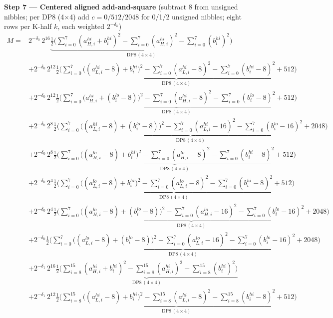 \documentclass[fleqn]{article}
\newcommand{\DPop}[3]{\mathrm{DP#1}\,(#2\!\times\!#3)}
\begin{document}
\textbf{Step 7 --- Centered aligned add-and-square}\quad
{\small(subtract $8$ from unsigned nibbles; per DP8 (4$\times$4) add $c=0/512/2048$ for 0/1/2 unsigned nibbles; eight rows per K-half $k$, each weighted $2^{-\delta_k}$)}
{\small
\begin{align*}
M = {}
  & 2^{-\delta_0}\,2^{16}\underbrace{\tfrac12\Big(\sum_{i=0}^{7}(a_{H,i}^{hi}{+}b_i^{hi})^2 - \sum_{i=0}^{7}(a_{H,i}^{hi})^2 - \sum_{i=0}^{7}(b_i^{hi})^2\Big)}_{\DPop{8}{4}{4}} \\[0.15em]
  & + 2^{-\delta_0}\,2^{12}\underbrace{\tfrac12\Big(\sum_{i=0}^{7}\big((a_{L,i}^{hi}{-}8){+}b_i^{hi}\big)^2 - \sum_{i=0}^{7}(a_{L,i}^{hi}{-}8)^2 - \sum_{i=0}^{7}(b_i^{hi}{-}8)^2 + 512\Big)}_{\DPop{8}{4}{4}} \\[0.15em]
  & + 2^{-\delta_0}\,2^{12}\underbrace{\tfrac12\Big(\sum_{i=0}^{7}\big(a_{H,i}^{hi}{+}(b_i^{lo}{-}8)\big)^2 - \sum_{i=0}^{7}(a_{H,i}^{hi}{-}8)^2 - \sum_{i=0}^{7}(b_i^{lo}{-}8)^2 + 512\Big)}_{\DPop{8}{4}{4}} \\[0.15em]
  & + 2^{-\delta_0}\,2^{8}\underbrace{\tfrac12\Big(\sum_{i=0}^{7}\big((a_{L,i}^{hi}{-}8){+}(b_i^{lo}{-}8)\big)^2 - \sum_{i=0}^{7}(a_{L,i}^{hi}{-}16)^2 - \sum_{i=0}^{7}(b_i^{lo}{-}16)^2 + 2048\Big)}_{\DPop{8}{4}{4}} \\[0.15em]
  & + 2^{-\delta_0}\,2^{8}\underbrace{\tfrac12\Big(\sum_{i=0}^{7}\big((a_{H,i}^{lo}{-}8){+}b_i^{hi}\big)^2 - \sum_{i=0}^{7}(a_{H,i}^{lo}{-}8)^2 - \sum_{i=0}^{7}(b_i^{hi}{-}8)^2 + 512\Big)}_{\DPop{8}{4}{4}} \\[0.15em]
  & + 2^{-\delta_0}\,2^{4}\underbrace{\tfrac12\Big(\sum_{i=0}^{7}\big((a_{L,i}^{lo}{-}8){+}b_i^{hi}\big)^2 - \sum_{i=0}^{7}(a_{L,i}^{lo}{-}8)^2 - \sum_{i=0}^{7}(b_i^{hi}{-}8)^2 + 512\Big)}_{\DPop{8}{4}{4}} \\[0.15em]
  & + 2^{-\delta_0}\,2^{4}\underbrace{\tfrac12\Big(\sum_{i=0}^{7}\big((a_{H,i}^{lo}{-}8){+}(b_i^{lo}{-}8)\big)^2 - \sum_{i=0}^{7}(a_{H,i}^{lo}{-}16)^2 - \sum_{i=0}^{7}(b_i^{lo}{-}16)^2 + 2048\Big)}_{\DPop{8}{4}{4}} \\[0.15em]
  & + 2^{-\delta_0}\underbrace{\tfrac12\Big(\sum_{i=0}^{7}\big((a_{L,i}^{lo}{-}8){+}(b_i^{lo}{-}8)\big)^2 - \sum_{i=0}^{7}(a_{L,i}^{lo}{-}16)^2 - \sum_{i=0}^{7}(b_i^{lo}{-}16)^2 + 2048\Big)}_{\DPop{8}{4}{4}} \\[0.15em]
  & + 2^{-\delta_1}\,2^{16}\underbrace{\tfrac12\Big(\sum_{i=8}^{15}(a_{H,i}^{hi}{+}b_i^{hi})^2 - \sum_{i=8}^{15}(a_{H,i}^{hi})^2 - \sum_{i=8}^{15}(b_i^{hi})^2\Big)}_{\DPop{8}{4}{4}} \\[0.15em]
  & + 2^{-\delta_1}\,2^{12}\underbrace{\tfrac12\Big(\sum_{i=8}^{15}\big((a_{L,i}^{hi}{-}8){+}b_i^{hi}\big)^2 - \sum_{i=8}^{15}(a_{L,i}^{hi}{-}8)^2 - \sum_{i=8}^{15}(b_i^{hi}{-}8)^2 + 512\Big)}_{\DPop{8}{4}{4}} \\[0.15em]

\end{align*}}
\end{document}
